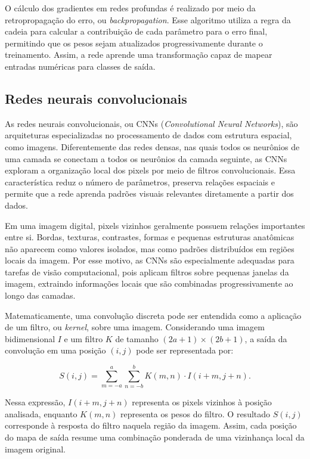 \documentclass[
    12pt,
    openright,
    oneside,
    a4paper,
    english,
    brazil
]{abntex2}
\begin{document}
O cálculo dos gradientes em redes profundas é realizado por meio da retropropagação do erro, ou \textit{backpropagation}. Esse algoritmo utiliza a regra da cadeia para calcular a contribuição de cada parâmetro para o erro final, permitindo que os pesos sejam atualizados progressivamente durante o treinamento. Assim, a rede aprende uma transformação capaz de mapear entradas numéricas para classes de saída.

\subsection{Redes neurais convolucionais}
\label{subsec:redes_neurais_convolucionais}

As redes neurais convolucionais, ou CNNs (\textit{Convolutional Neural Networks}), são arquiteturas especializadas no processamento de dados com estrutura espacial, como imagens. Diferentemente das redes densas, nas quais todos os neurônios de uma camada se conectam a todos os neurônios da camada seguinte, as CNNs exploram a organização local dos pixels por meio de filtros convolucionais. Essa característica reduz o número de parâmetros, preserva relações espaciais e permite que a rede aprenda padrões visuais relevantes diretamente a partir dos dados.

Em uma imagem digital, pixels vizinhos geralmente possuem relações importantes entre si. Bordas, texturas, contrastes, formas e pequenas estruturas anatômicas não aparecem como valores isolados, mas como padrões distribuídos em regiões locais da imagem. Por esse motivo, as CNNs são especialmente adequadas para tarefas de visão computacional, pois aplicam filtros sobre pequenas janelas da imagem, extraindo informações locais que são combinadas progressivamente ao longo das camadas.

Matematicamente, uma convolução discreta pode ser entendida como a aplicação de um filtro, ou \textit{kernel}, sobre uma imagem. Considerando uma imagem bidimensional \(I\) e um filtro \(K\) de tamanho \((2a+1) \times (2b+1)\), a saída da convolução em uma posição \((i,j)\) pode ser representada por:

\[
S(i,j) =
\sum_{m=-a}^{a}
\sum_{n=-b}^{b}
K(m,n)\cdot I(i+m,j+n).
\]

Nessa expressão, \(I(i+m,j+n)\) representa os pixels vizinhos à posição analisada, enquanto \(K(m,n)\) representa os pesos do filtro. O resultado \(S(i,j)\) corresponde à resposta do filtro naquela região da imagem. Assim, cada posição do mapa de saída resume uma combinação ponderada de uma vizinhança local da imagem original.
\end{document}
